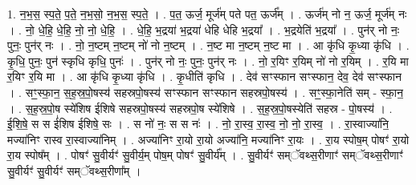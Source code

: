\documentclass[17pt]{extarticle}
\begin{document}
1. न॒भ॒स॒ स्प॒ते॒ प॒ते॒ न॒भ॒सो॒ न॒भ॒स॒ स्प॒ते॒ । . प॒त॒ ऊर्ज॒ मूर्ज॑म् पते पत॒ ऊर्ज᳚म् । . ऊर्ज॑म् नो न॒ ऊर्ज॒ मूर्ज॑म् नः । . नो॒ धे॒हि॒ धे॒हि॒ नो॒ नो॒ धे॒हि॒ । . धे॒हि॒ भ॒द्रया॑ भ॒द्रया॑ धेहि धेहि भ॒द्रया᳚ । . भ॒द्रयेति॑ भ॒द्रया᳚ । . पुन॑र् नो नः॒ पुनः॒ पुन॑र् नः । . नो॒ न॒ष्टम् न॒ष्टम् नो॑ नो न॒ष्टम् । . न॒ष्ट मा न॒ष्टम् न॒ष्ट मा । . आ कृ॑धि कृ॒ध्या कृ॑धि । . कृ॒धि॒ पुनः॒ पुन॑ स्कृधि कृधि॒ पुनः॑ । . पुन॑र् नो नः॒ पुनः॒ पुन॑र् नः । . नो॒ र॒यिꣳ र॒यिम् नो॑ नो र॒यिम् । . र॒यि मा र॒यिꣳ र॒यि मा । . आ कृ॑धि कृ॒ध्या कृ॑धि । . कृ॒धीति॑ कृधि । . देव॑ सꣳस्फान सꣳस्फान॒ देव॒ देव॑ सꣳस्फान । . सꣳ॒॒स्फा॒न॒ स॒ह॒स्र॒पो॒षस्य॑ सहस्रपो॒षस्य॑ सꣳस्फान सꣳस्फान सहस्रपो॒षस्य॑ । . सꣳ॒॒स्फा॒नेति॑ सम् - स्फा॒न॒ । . स॒ह॒स्र॒पो॒ष स्ये॑शिष ईशिषे सहस्रपो॒षस्य॑ सहस्रपो॒ष स्ये॑शिषे । . स॒ह॒स्र॒पो॒षस्येति॑ सहस्र - पो॒षस्य॑ । . ई॒शि॒षे॒ स स ई॑शिष ईशिषे॒ सः । . स नो॑ नः॒ स स नः॑ । . नो॒ रा॒स्व॒ रा॒स्व॒ नो॒ नो॒ रा॒स्व॒ । . रा॒स्वाज्या॑नि॒ मज्या॑निꣳ रास्व रा॒स्वाज्या॑निम् । . अज्या॑निꣳ रा॒यो रा॒यो अज्या॑नि॒ मज्या॑निꣳ रा॒यः । . रा॒य स्पोष॒म् पोषꣳ॑ रा॒यो रा॒य स्पोष᳚म् । . पोषꣳ॑ सु॒वीर्यꣳ॑ सु॒वीर्य॒म् पोष॒म् पोषꣳ॑ सु॒वीर्य᳚म् । . सु॒वीर्यꣳ॑ सम्ॅवथ्स॒रीणाꣳ॑ सम्ॅवथ्स॒रीणाꣳ॑ सु॒वीर्यꣳ॑ सु॒वीर्यꣳ॑ सम्ॅवथ्स॒रीणा᳚म् । \newline
\end{document}
